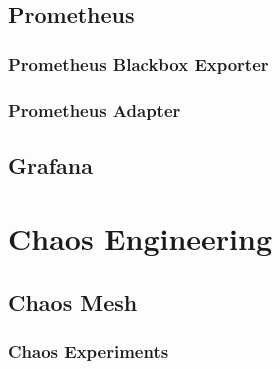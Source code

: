 \subsection{Prometheus}

\subsubsection{Prometheus Blackbox Exporter}

\subsubsection{Prometheus Adapter}


\subsection{Grafana}


\section{Chaos Engineering}

\subsection{Chaos Mesh}

\subsubsection{Chaos Experiments}



